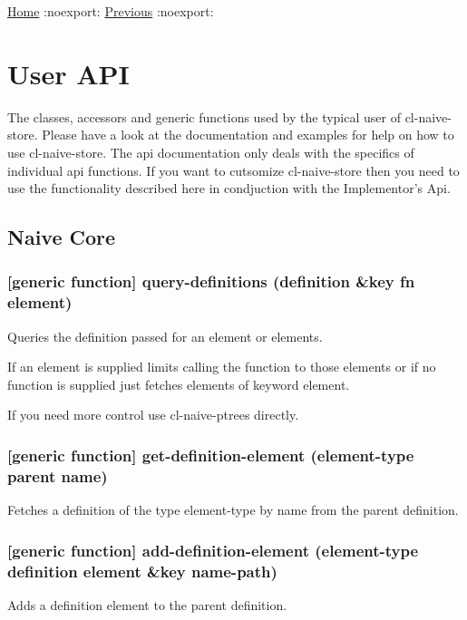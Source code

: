 \documentclass[11pt]{article}
\begin{document}
\href{home.org}{Home} :noexport: \href{documents-example.org}{Previous} :noexport:

\section{User API}
\label{sec:org743234b}

The classes, accessors and generic functions used by the typical user
of cl-naive-store. Please have a look at the documentation and
examples for help on how to use cl-naive-store. The api documentation
only deals with the specifics of individual api functions. If you want
to cutsomize cl-naive-store then you need to use the functionality
described here in condjuction with the Implementor's Api.

\subsection{Naive Core}
\label{sec:orgd78be29}

\subsubsection{[generic function] query-definitions (definition \&key fn element)}
\label{sec:orga6810f8}

Queries the definition passed for an element or elements.

If an element is supplied limits calling the function to those elements or if no function is supplied just fetches elements of keyword element.

If you need more control use cl-naive-ptrees directly.

\subsubsection{[generic function] get-definition-element (element-type parent name)}
\label{sec:orgd05ff2e}

Fetches a definition of the type element-type by name from the parent definition.

\subsubsection{[generic function] add-definition-element (element-type definition element \&key name-path)}
\label{sec:org1995cdd}

Adds a definition element to the parent definition.
\end{document}
